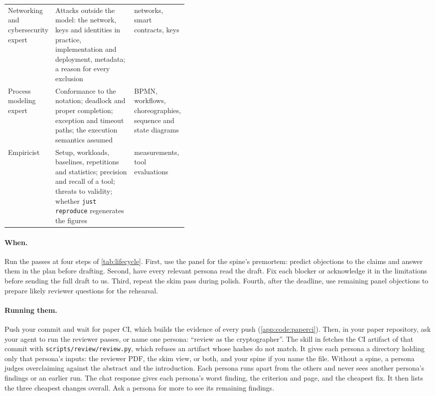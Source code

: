{\begin{xltabular}{\linewidth}{>{\raggedright\arraybackslash}p{0.2\linewidth} X >{\raggedright\arraybackslash}p{0.22\linewidth}}
  Networking and cybersecurity expert & Attacks outside the model: the network, keys and identities in practice, implementation and deployment, metadata; a reason for every exclusion & networks, smart contracts, keys \\
  Process modeling expert & Conformance to the notation; deadlock and proper completion; exception and timeout paths; the execution semantics assumed & BPMN, workflows, choreographies, sequence and state diagrams \\
  Empiricist & Setup, workloads, baselines, repetitions and statistics; precision and recall of a tool; threats to validity; whether \texttt{just reproduce} regenerates the figures & measurements, tool evaluations \\
\end{xltabular}
}

\paragraph{When.} Run the passes at four steps of \cref{tab:lifecycle}. First, use the panel for the spine's premortem: predict objections to the claims and answer them in the plan before drafting. Second, have every relevant persona read the draft. Fix each blocker or acknowledge it in the limitations before sending the full draft to us. Third, repeat the skim pass during polish. Fourth, after the deadline, use remaining panel objections to prepare likely reviewer questions for the rehearsal.

\paragraph{Running them.} Push your commit and wait for paper CI, which builds the evidence of every push (\cref{app:code:paperci}). Then, in your paper repository, ask your agent to run the reviewer passes, or name one persona: \enquote{review as the cryptographer}. The skill in  fetches the CI artifact of that commit with \texttt{scripts/review/review.py}, which refuses an artifact whose hashes do not match. It gives each persona a directory holding only that persona's inputs: the reviewer PDF, the skim view, or both, and your spine if you name the file. Without a spine, a persona judges overclaiming against the abstract and the introduction. Each persona runs apart from the others and never sees another persona's findings or an earlier run. The chat response gives each persona's worst finding, the criterion and page, and the cheapest fix. It then lists the three cheapest changes overall. Ask a persona for more to see its remaining findings.

